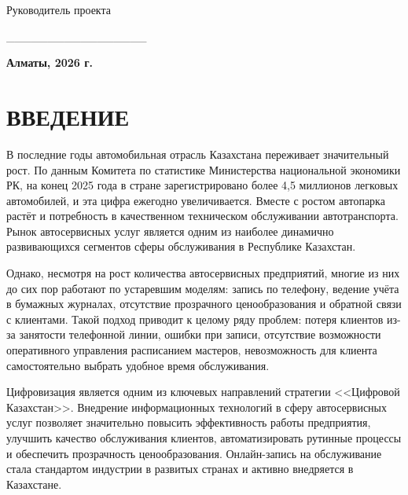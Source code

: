 \documentclass[14pt,a4paper,oneside]{extarticle}
\begin{document}
\begin{titlepage}
\begin{center}
\vspace{16pt}

\begin{minipage}[t]{0.48\textwidth}
\raggedright
Руководитель проекта
\end{minipage}
\hfill
\begin{minipage}[t]{0.42\textwidth}
\raggedleft
\_\_\_\_\_\_\_\_\_\_\_\_\_\_\_\_\_
\end{minipage}

\vfill
\textbf{Алматы, 2026 г.}

\end{center}
\end{titlepage}


\newpage
\tableofcontents
\thispagestyle{fancy}


\newpage
\section*{ВВЕДЕНИЕ}

В последние годы автомобильная отрасль Казахстана переживает значительный рост. По данным Комитета по статистике Министерства национальной экономики РК, на конец 2025 года в стране зарегистрировано более 4,5 миллионов легковых автомобилей, и эта цифра ежегодно увеличивается. Вместе с ростом автопарка растёт и потребность в качественном техническом обслуживании автотранспорта. Рынок автосервисных услуг является одним из наиболее динамично развивающихся сегментов сферы обслуживания в Республике Казахстан.

Однако, несмотря на рост количества автосервисных предприятий, многие из них до сих пор работают по устаревшим моделям: запись по телефону, ведение учёта в бумажных журналах, отсутствие прозрачного ценообразования и обратной связи с клиентами. Такой подход приводит к целому ряду проблем: потеря клиентов из-за занятости телефонной линии, ошибки при записи, отсутствие возможности оперативного управления расписанием мастеров, невозможность для клиента самостоятельно выбрать удобное время обслуживания.

Цифровизация является одним из ключевых направлений стратегии <<Цифровой Казахстан>>. Внедрение информационных технологий в сферу автосервисных услуг позволяет значительно повысить эффективность работы предприятия, улучшить качество обслуживания клиентов, автоматизировать рутинные процессы и обеспечить прозрачность ценообразования. Онлайн-запись на обслуживание стала стандартом индустрии в развитых странах и активно внедряется в Казахстане.
\end{document}
